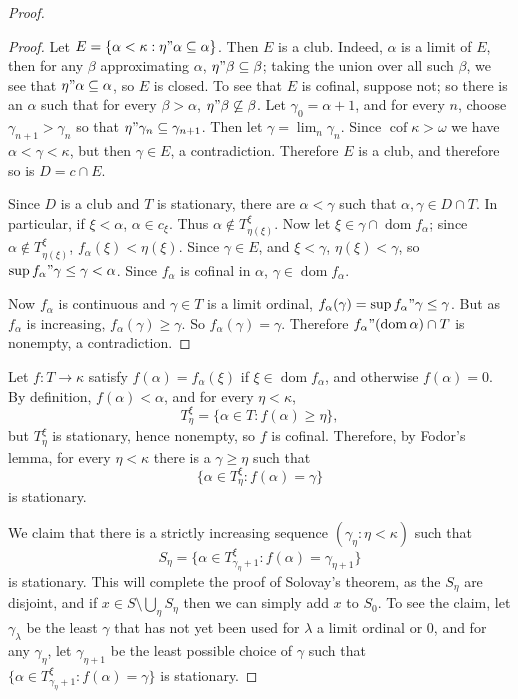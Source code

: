 \documentclass[12pt]{report}
\DeclareMathOperator{\cof}{cof}
\DeclareMathOperator{\dom}{dom}
\theoremstyle{definition}
\begin{document}
\begin{proof}
\begin{proof}
Let $E = \{\alpha < \kappa: \eta"\alpha \subseteq \alpha\}$.
Then $E$ is a club.
Indeed, $\alpha$ is a limit of $E$, then for any $\beta$ approximating $\alpha$, $\eta"\beta \subseteq \beta$; taking the union over all such $\beta$, we see that $\eta"\alpha \subseteq \alpha$, so $E$ is closed.
To see that $E$ is cofinal, suppose not; so there is an $\alpha$ such that for every $\beta > \alpha$, $\eta"\beta \not \subseteq \beta$.
Let $\gamma_0 = \alpha + 1$, and for every $n$, choose $\gamma_{n+1} > \gamma_n$ so that $\eta"\gamma_n \subseteq \gamma_{n+1}$.
Then let $\gamma = \lim_n \gamma_n$. Since $\cof \kappa > \omega$ we have $\alpha < \gamma < \kappa$, but then $\gamma \in E$, a contradiction.
Therefore $E$ is a club, and therefore so is $D = c \cap E$.

Since $D$ is a club and $T$ is stationary, there are $\alpha < \gamma$ such that $\alpha, \gamma \in D \cap T$.
In particular, if $\xi < \alpha$, $\alpha \in c_\xi$. Thus $\alpha \notin T^\xi_{\eta(\xi)}$.
Now let $\xi \in \gamma \cap \dom f_\alpha$; since $\alpha \notin T^\xi_{\eta(\xi)}$, $f_\alpha(\xi) < \eta(\xi)$.
Since $\gamma \in E$, and $\xi < \gamma$, $\eta(\xi) < \gamma$, so $\sup f_\alpha"\gamma \leq \gamma < \alpha$.
Since $f_\alpha$ is cofinal in $\alpha$, $\gamma \in \dom f_\alpha$.

Now $f_\alpha$ is continuous and $\gamma \in T$ is a limit ordinal, $f_\alpha(\gamma) = \sup f_\alpha"\gamma \leq \gamma$.
But as $f_\alpha$ is increasing, $f_\alpha(\gamma) \geq \gamma$. So $f_\alpha(\gamma) = \gamma$.
Therefore $f_\alpha"(\dom \alpha) \cap T$ is nonempty, a contradiction.
\end{proof}
Let $f: T \to \kappa$ satisfy $f(\alpha) = f_\alpha(\xi)$ if $\xi \in \dom f_\alpha$, and otherwise $f(\alpha) = 0$.
By definition, $f(\alpha) < \alpha$, and for every $\eta < \kappa$,
$$T_\eta^\xi = \{\alpha \in T: f(\alpha) \geq \eta\},$$
but $T_\eta^\xi$ is stationary, hence nonempty, so $f$ is cofinal.
Therefore, by Fodor's lemma, for every $\eta < \kappa$ there is a $\gamma \geq \eta$ such that
$$\{\alpha \in T_\eta^\xi: f(\alpha) = \gamma\}$$
is stationary.

We claim that there is a strictly increasing sequence $(\gamma_\eta: \eta < \kappa)$ such that
$$S_\eta = \{\alpha \in T_{\gamma_\eta + 1}^\xi: f(\alpha) = \gamma_{\eta + 1}\}$$
is stationary. This will complete the proof of Solovay's theorem, as the $S_\eta$ are disjoint,
and if $x \in S \setminus \bigcup_\eta S_\eta$ then we can simply add $x$ to $S_0$.
To see the claim, let $\gamma_\lambda$ be the least $\gamma$ that has not yet been used for $\lambda$ a limit ordinal or $0$,
and for any $\gamma_\eta$, let $\gamma_{\eta + 1}$ be the least possible choice of $\gamma$
such that $\{\alpha \in T_{\gamma_\eta + 1}^\xi: f(\alpha) = \gamma\}$ is stationary.
\end{proof}
\end{document}
